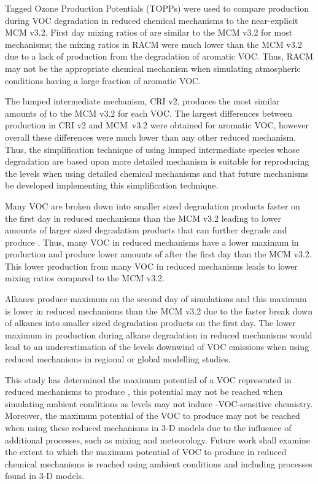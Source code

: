 Tagged Ozone Production Potentials (TOPPs) were used to compare  production during VOC degradation in reduced chemical mechanisms to the near-explicit MCM v3.2. 
First day mixing ratios of  are similar to the MCM v3.2 for most mechanisms; the  mixing ratios in RACM were much lower than the MCM v3.2 due to a lack of  production from the degradation of aromatic VOC.
Thus, RACM may not be the appropriate chemical mechanism when simulating atmospheric conditions having a large fraction of aromatic VOC.

The lumped intermediate mechanism, CRI v2, produces the most similar amounts of  to the MCM v3.2 for each VOC.
The largest differences between  production in CRI v2 and \mbox{MCM v3.2} were obtained for aromatic VOC, however overall these differences were much lower than any other reduced mechanism.
Thus, the simplification technique of using lumped intermediate species whose degradation are based upon more detailed mechanism is suitable for reproducing the  levels when using detailed chemical mechanisms and that future mechanisms be developed implementing this simplification technique.

Many VOC are broken down into smaller sized degradation products faster on the first day in reduced mechanisms than the MCM v3.2 leading to lower amounts of larger sized degradation products that can further degrade and produce .
Thus, many VOC in reduced mechanisms have a lower maximum in  production and produce lower amounts of  after the first day than the MCM v3.2.
This lower  production from many VOC in reduced mechanisms leads to lower  mixing ratios compared to the MCM v3.2.

Alkanes produce maximum  on the second day of simulations and this maximum is lower in reduced mechanisms than the MCM v3.2 due to the faster break down of alkanes into smaller sized degradation products on the first day.
The lower maximum in  production during alkane degradation in reduced mechanisms would lead to an underestimation of the  levels downwind of VOC emissions when using reduced mechanisms in regional or global modelling studies.

This study has determined the maximum potential of a VOC represented in reduced mechanisms to produce , this potential may not be reached when simulating ambient conditions as  levels may not induce -VOC-sensitive chemistry.
Moreover, the maximum potential of the VOC to produce  may not be reached when using these reduced mechanisms in 3-D models due to the influence of additional processes, such as mixing and meteorology.
Future work shall examine the extent to which the maximum potential of VOC to produce  in reduced chemical mechanisms is reached using ambient  conditions and including processes found in 3-D models.
